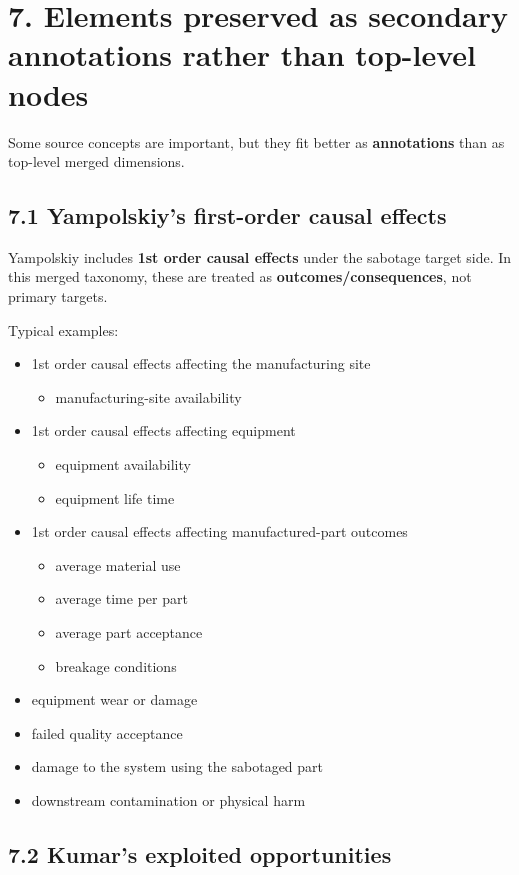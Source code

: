 \documentclass[10pt,a4paper,oneside]{report}
\begin{document}
\chapter{7. Elements preserved as secondary annotations rather than top-level nodes}


Some source concepts are important, but they fit better as \textbf{annotations} than as top-level merged dimensions.


\section{7.1 Yampolskiy's first-order causal effects}


Yampolskiy includes \textbf{1st order causal effects} under the sabotage target side. In this merged taxonomy, these are treated as \textbf{outcomes/consequences}, not primary targets.

Typical examples:

\begin{itemize}
\item 1st order causal effects affecting the manufacturing site
\begin{itemize}
\item manufacturing-site availability
\end{itemize}
\item 1st order causal effects affecting equipment
\begin{itemize}
\item equipment availability
\item equipment life time
\end{itemize}
\item 1st order causal effects affecting manufactured-part outcomes
\begin{itemize}
\item average material use
\item average time per part
\item average part acceptance
\item breakage conditions
\end{itemize}
\item equipment wear or damage
\item failed quality acceptance
\item damage to the system using the sabotaged part
\item downstream contamination or physical harm
\end{itemize}


\section{7.2 Kumar's exploited opportunities}
\end{document}
